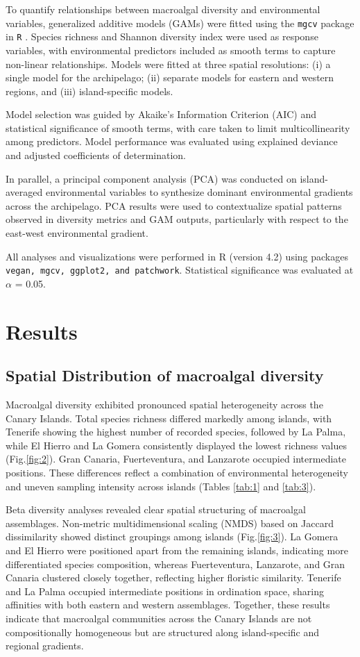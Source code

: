 \documentclass[a4paper,fleqn]{cas-sc}
\begin{document}
To quantify relationships between macroalgal diversity and environmental variables, generalized additive models (GAMs) were fitted using the \texttt{mgcv} package in \texttt{R} \citep{Wood2017}. Species richness and Shannon diversity index were used as response variables, with environmental predictors included as smooth terms to capture non-linear relationships. Models were fitted at three spatial resolutions: (i) a single model for the archipelago; (ii) separate models for eastern and western regions, and (iii) island-specific models. 

Model selection was guided by Akaike's Information Criterion (AIC) and statistical significance of smooth terms, with care taken to limit multicollinearity among predictors. Model performance was evaluated using explained deviance and adjusted coefficients of determination.

In parallel, a principal component analysis (PCA) was conducted on island-averaged environmental variables to synthesize dominant environmental gradients across the archipelago. PCA results were used to contextualize spatial patterns observed in diversity metrics and GAM outputs, particularly with respect to the east-west environmental gradient. 

All analyses and visualizations were performed in R (version 4.2) using packages \texttt{vegan, mgcv, ggplot2, and patchwork}. Statistical significance was evaluated at $\alpha$ = 0.05. 

\section{Results}
\subsection{Spatial Distribution of macroalgal diversity}

Macroalgal diversity exhibited pronounced spatial heterogeneity across the Canary Islands. Total species richness differed markedly among islands, with Tenerife showing the highest number of recorded species, followed by La Palma, while El Hierro and La Gomera consistently displayed the lowest richness values (Fig.\ref{fig:2}). Gran Canaria, Fuerteventura, and Lanzarote occupied intermediate positions. These differences reflect a combination of environmental heterogeneity and uneven sampling intensity across islands (Tables \ref{tab:1} and \ref{tab:3}).

Beta diversity analyses revealed clear spatial structuring of macroalgal assemblages. Non-metric multidimensional scaling (NMDS) based on Jaccard dissimilarity showed distinct groupings among islands (Fig.\ref{fig:3}). La Gomera and El Hierro were positioned apart from the remaining islands, indicating more differentiated species composition, whereas Fuerteventura, Lanzarote, and Gran Canaria clustered closely together, reflecting higher floristic similarity. Tenerife and La Palma occupied intermediate positions in ordination space, sharing affinities with both eastern and western assemblages. Together, these results indicate that macroalgal communities across the Canary Islands are not compositionally homogeneous but are structured along island-specific and regional gradients.
\end{document}
